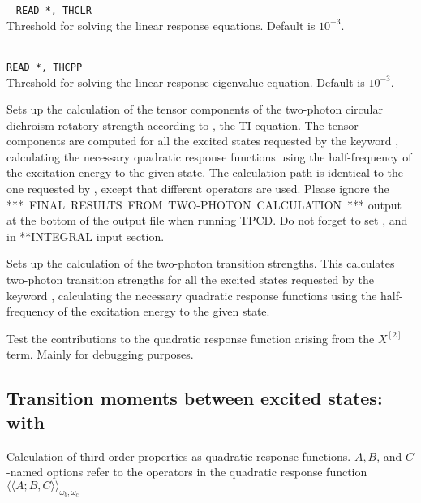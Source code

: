 \begin{description}
\item{}\verb| |\newline
\verb|READ *, THCLR|\\
Threshold for solving the linear response equations.
Default is $10^{-3}$.

\item{}\\
\verb|READ *, THCPP|\\
Threshold for solving the linear response
eigenvalue equation. Default is $10^{-3}$.

\item{}
Sets up the calculation of the tensor components of the two-photon circular dichroism rotatory
strength according to \cite{Rizzo:TPACD}, the TI equation.
The tensor components are computed for all the excited states
requested by the keyword , calculating the necessary
quadratic response functions using the half-frequency of the
excitation energy to the given state. The calculation path is identical to the
one requested by , except that different operators are used.
Please ignore the \mbox{***~FINAL~RESULTS~FROM~TWO-PHOTON~CALCULATION~***} output
at the bottom of the output file when running TPCD.
Do not forget to set ,  and  in **INTEGRAL
input section.


\item{}
Sets up the calculation of the two-photon transition strengths. This
calculates two-photon transition strengths for all the excited states
requested by the keyword , calculating the necessary
quadratic response functions using the half-frequency of the
excitation energy to the given state.

\item{}
Test the contributions to the quadratic response function arising from
the $X^{\left[2\right]}$ term. Mainly for debugging purposes.
\end{description}


\subsection{Transition moments between excited states:  with }

Calculation of third-order properties as quadratic response
functions.
$A,B$, and $C$-named options refer to the operators in the quadratic
response function
$\langle\!\langle A;B,C \rangle\!\rangle_{\omega_b,\omega_c}$
\cite{ovhapjhjajthjojcp97,hhhjajpjjojcp97,haovhkpjthjcp98}

